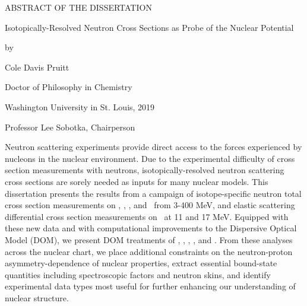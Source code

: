 \thispagestyle{plain}
\begin{center}

    ABSTRACT OF THE DISSERTATION

    Isotopically-Resolved Neutron Cross Sections as Probe of the Nuclear
    Potential

    \vspace{0.5 cm}

    by

    \vspace{0.2 cm}

    Cole Davis Pruitt

    \vspace{0.2 cm}

    Doctor of Philosophy in Chemistry

    \vspace{0.2 cm}

    Washington University in St. Louis, 2019

    \vspace{0.2cm}

    Professor Lee Sobotka, Chairperson
\end{center}

\vspace{1cm}

Neutron scattering experiments provide direct access to the forces experienced by nucleons in the
nuclear environment. Due to the experimental difficulty of cross section
measurements with neutrons, isotopically-resolved neutron scattering cross sections are sorely
needed as inputs for many nuclear models.
This dissertation presents the results from a campaign of
isotope-specific neutron total cross section measurements on \oSixEight, \niEightFour,
\snTwelveFour, and \rhThree\ from
3-400 MeV, and elastic scattering differential cross section measurements on
\snTwelveNatFour\ at 11 and 17 MeV. Equipped with these new data and
with computational improvements to the Dispersive Optical Model (DOM),
we present DOM treatments of \oSixEight, \caAughtEight, \niEightFour, 
\snTwelveFour, and \pbEight. From these analyses across the nuclear chart, we place additional 
constraints on the neutron-proton asymmetry-dependence of nuclear properties, extract essential bound-state 
quantities including spectroscopic factors and neutron skins, and identify experimental data types
most useful for further enhancing our understanding of nuclear structure.

